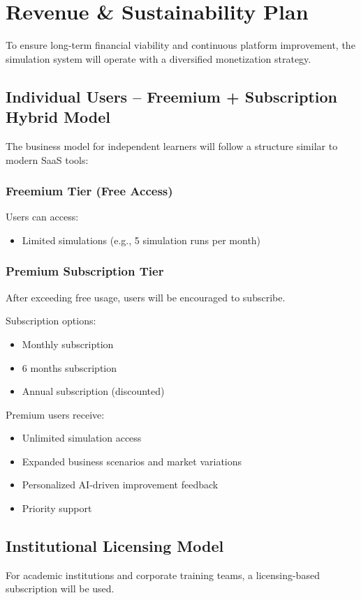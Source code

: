 \documentclass[12pt,letterpaper]{article}
\begin{document}
\section{Revenue \& Sustainability Plan}
To ensure long-term financial viability and continuous platform improvement, the simulation system will operate with a diversified monetization strategy.

\subsection{Individual Users – Freemium + Subscription Hybrid Model}
The business model for independent learners will follow a structure similar to modern SaaS tools:

\subsubsection{Freemium Tier (Free Access)}
Users can access:
\begin{itemize}
    \item Limited simulations (e.g., 5 simulation runs per month)
\end{itemize}

\subsubsection{Premium Subscription Tier}
After exceeding free usage, users will be encouraged to subscribe.

Subscription options:
\begin{itemize}
    \item Monthly subscription
    \item 6 months subscription
    \item Annual subscription (discounted)
\end{itemize}

Premium users receive:
\begin{itemize}
    \item Unlimited simulation access
    \item Expanded business scenarios and market variations
    \item Personalized AI-driven improvement feedback
    \item Priority support
\end{itemize}

\subsection{Institutional Licensing Model}
For academic institutions and corporate training teams, a licensing-based subscription will be used.
\end{document}
